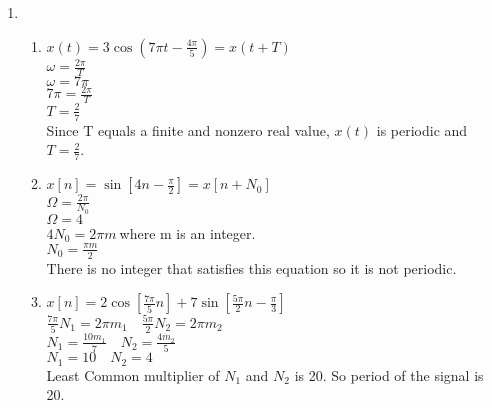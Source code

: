 \documentclass[10pt,a4paper, margin=1in]{article}
\begin{document}
\begin{enumerate}
\item %
    \begin{enumerate}
    \item %
    \( x(t) =3\cos(7\pi t-\frac{4\pi}{5})=x(t+T) \) \\
    \(\omega=\frac{2\pi}{T}\) \\
    \(\omega=7\pi\) \\
    \(7\pi=\frac{2\pi}{T}\) \\
    \(T=\frac{2}{7}\) \\
    Since T equals a finite and nonzero real value, \(x(t)\) is periodic and \
    \(T=\frac{2}{7}\).
    \item %
    \(x[n]=\sin[4n-\frac{\pi}{2}]=x[n+N_0]\)\\
    \(\Omega=\frac{2\pi}{N_0}\)\\
    \(\Omega=4\)\\
    \(4N_0=2\pi m\ \)where m is an integer.\\
    \(N_0=\frac{\pi m}{2}\)\\
    There is no integer that satisfies this equation so it is not periodic.
    \item %
    \(x[n]=2\cos[\frac{7\pi}{5}n]+ 7\sin[\frac{5\pi}{2}n-\frac{\pi}{3}]\)\\
    \(\frac{7\pi}{5}N_1=2\pi m_1\quad \frac{5\pi}{2}N_2=2\pi m_2 \)\\
    \(N_1=\frac{10m_1}{7} \quad N_2=\frac{4m_2}{5} \)\\
    \(N_1=10 \quad N_2=4\)\\
    Least Common multiplier of \(N_1\) and \(N_2\) is 20. So period of the signal is 20.
    \end{enumerate}



\end{enumerate}
\end{document}
